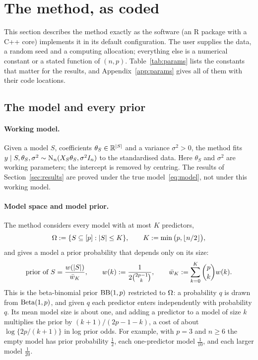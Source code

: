 \section{The method, as coded}\label{sec:method}

This section describes the method exactly as the software (an R package with a C++ core) implements it in its default
configuration. The user supplies
the data, a random seed and a computing allocation; everything else is a numerical constant or a stated function of
$(n,p)$. Table~\ref{tab:params} lists the constants that matter for the results, and Appendix~\ref{app:params} gives all
of them with their code locations.

\subsection{The model and every prior}\label{sec:prior}

\paragraph{Working model.} Given a model $S$, coefficients $\theta_S\in\mathbb{R}^{\lvert S\rvert}$ and a variance $\sigma^2>0$, the
method fits $y\mid S,\theta_S,\sigma^2\sim\mathrm{N}_n(X_S\theta_S,\sigma^2I_n)$ to the standardised data. Here $\theta_S$
and $\sigma^2$ are working parameters; the intercept is removed by centring. The results of Section~\ref{sec:results} are
proved under the true model~\eqref{eq:model}, not under this working model.

\paragraph{Model space and model prior.} The method considers every model with at most $K$ predictors,
\begin{equation}\label{eq:space}
  \Omega:=\{S\subseteq[p]:\lvert S\rvert\le K\},\qquad K:=\min\big(p,\lfloor n/2\rfloor\big),
\end{equation}
and gives a model a prior probability that depends only on its size:
\begin{equation}\label{eq:modelprior}
  \text{prior of }S=\frac{w(\lvert S\rvert)}{\bar w_K},\qquad w(k):=\frac{1}{2\binom{2p-1}{k}},\qquad
  \bar w_K:=\sum_{k=0}^{K}\binom{p}{k}w(k).
\end{equation}
This is the beta-binomial prior $\mathrm{BB}(1,p)$ \citep{ScottBerger2010} restricted to $\Omega$: a probability $q$ is drawn from
$\mathrm{Beta}(1,p)$, and given $q$ each predictor enters independently with probability $q$. Its mean model size is about
one, and adding a predictor to a model of size $k$ multiplies the prior by $(k+1)/(2p-1-k)$, a cost of about
$\log\{2p/(k+1)\}$ in log prior odds. For example, with $p=3$ and $n\ge6$ the empty model has prior probability $\tfrac12$,
each one-predictor model $\tfrac1{10}$, and each larger model $\tfrac1{20}$.


